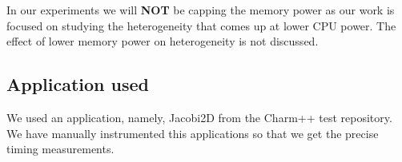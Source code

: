 In our experiments we will \textbf{NOT} be capping the
memory power as our work is focused on studying the heterogeneity that comes up at
lower CPU power. The effect of lower memory power on heterogeneity is not
discussed.



\subsection{Application used}
We used an application, namely, Jacobi2D  from the
Charm++ test repository.  We have manually instrumented this applications so that
we get the precise timing measurements.  

